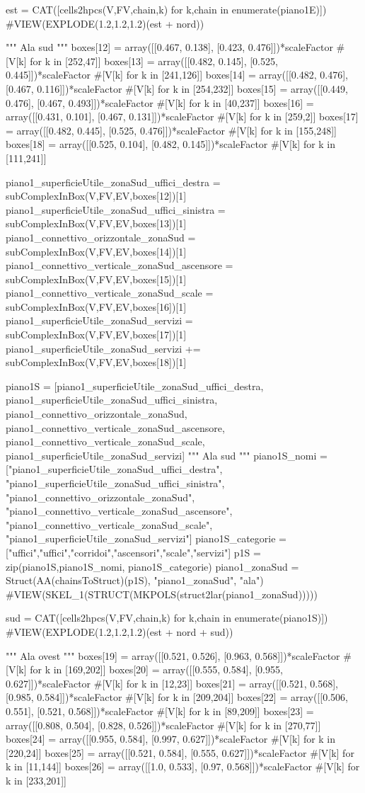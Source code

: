 est = CAT([cells2hpcs(V,FV,chain,k) for k,chain in enumerate(piano1E)])
#VIEW(EXPLODE(1.2,1.2,1.2)(est + nord))

""" Ala sud """
boxes[12] = array([[0.467, 0.138], [0.423, 0.476]])*scaleFactor #[V[k] for k in [252,47]]
boxes[13] = array([[0.482, 0.145], [0.525, 0.445]])*scaleFactor #[V[k] for k in [241,126]]
boxes[14] = array([[0.482, 0.476], [0.467, 0.116]])*scaleFactor #[V[k] for k in [254,232]]
boxes[15] = array([[0.449, 0.476], [0.467, 0.493]])*scaleFactor #[V[k] for k in [40,237]]
boxes[16] = array([[0.431, 0.101], [0.467, 0.131]])*scaleFactor #[V[k] for k in [259,2]]
boxes[17] = array([[0.482, 0.445], [0.525, 0.476]])*scaleFactor #[V[k] for k in [155,248]]
boxes[18] = array([[0.525, 0.104], [0.482, 0.145]])*scaleFactor #[V[k] for k in [111,241]]

piano1_superficieUtile_zonaSud_uffici_destra = subComplexInBox(V,FV,EV,boxes[12])[1]
piano1_superficieUtile_zonaSud_uffici_sinistra = subComplexInBox(V,FV,EV,boxes[13])[1]
piano1_connettivo_orizzontale_zonaSud = subComplexInBox(V,FV,EV,boxes[14])[1]
piano1_connettivo_verticale_zonaSud_ascensore = subComplexInBox(V,FV,EV,boxes[15])[1]
piano1_connettivo_verticale_zonaSud_scale = subComplexInBox(V,FV,EV,boxes[16])[1]
piano1_superficieUtile_zonaSud_servizi = subComplexInBox(V,FV,EV,boxes[17])[1]
piano1_superficieUtile_zonaSud_servizi += subComplexInBox(V,FV,EV,boxes[18])[1]

piano1S = [piano1_superficieUtile_zonaSud_uffici_destra, piano1_superficieUtile_zonaSud_uffici_sinistra, piano1_connettivo_orizzontale_zonaSud, piano1_connettivo_verticale_zonaSud_ascensore, piano1_connettivo_verticale_zonaSud_scale, piano1_superficieUtile_zonaSud_servizi]
""" Ala sud """
piano1S_nomi = ["piano1_superficieUtile_zonaSud_uffici_destra", "piano1_superficieUtile_zonaSud_uffici_sinistra", "piano1_connettivo_orizzontale_zonaSud", "piano1_connettivo_verticale_zonaSud_ascensore", "piano1_connettivo_verticale_zonaSud_scale", "piano1_superficieUtile_zonaSud_servizi"]
piano1S_categorie = ["uffici","uffici","corridoi","ascensori","scale","servizi"]
p1S = zip(piano1S,piano1S_nomi, piano1S_categorie)
piano1_zonaSud = Struct(AA(chainsToStruct)(p1S), "piano1_zonaSud", "ala")
#VIEW(SKEL_1(STRUCT(MKPOLS(struct2lar(piano1_zonaSud)))))
    
sud = CAT([cells2hpcs(V,FV,chain,k) for k,chain in enumerate(piano1S)])
#VIEW(EXPLODE(1.2,1.2,1.2)(est + nord + sud))

""" Ala ovest """
boxes[19] = array([[0.521, 0.526], [0.963, 0.568]])*scaleFactor #[V[k] for k in [169,202]]
boxes[20] = array([[0.555, 0.584], [0.955, 0.627]])*scaleFactor #[V[k] for k in [12,23]]
boxes[21] = array([[0.521, 0.568], [0.985, 0.584]])*scaleFactor #[V[k] for k in [209,204]]
boxes[22] = array([[0.506, 0.551], [0.521, 0.568]])*scaleFactor #[V[k] for k in [89,209]]
boxes[23] = array([[0.808, 0.504], [0.828, 0.526]])*scaleFactor #[V[k] for k in [270,77]]
boxes[24] = array([[0.955, 0.584], [0.997, 0.627]])*scaleFactor #[V[k] for k in [220,24]]
boxes[25] = array([[0.521, 0.584], [0.555, 0.627]])*scaleFactor #[V[k] for k in [11,144]]
boxes[26] = array([[1.0, 0.533], [0.97, 0.568]])*scaleFactor #[V[k] for k in [233,201]]

